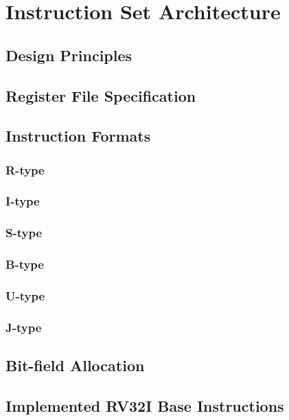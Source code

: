 \chapter{Instruction Set Architecture}
\label{ch:isa}

\section{Design Principles}

\section{Register File Specification}

\section{Instruction Formats}
\subsection{R-type}
\subsection{I-type}
\subsection{S-type}
\subsection{B-type}
\subsection{U-type}
\subsection{J-type}

\section{Bit-field Allocation}

\section{Implemented RV32I Base Instructions}

